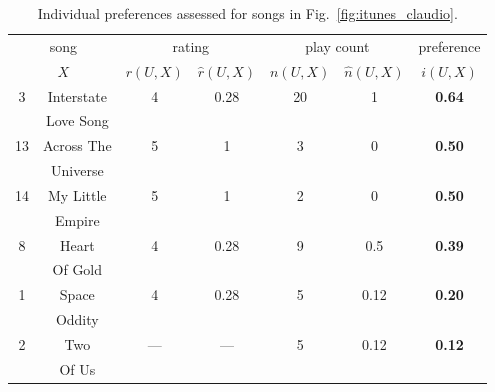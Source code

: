\begin{table}[bhtp]
\centering \setlength{\abovecaptionskip}{3pt}
\caption{Individual preferences assessed for songs in Fig.~\ref{fig:itunes_claudio}.}\label{table:itunes}
\begin{tabular}{|cc|c|c|c|c|c|}
\hline
\multicolumn{2}{|c|}{song}&\multicolumn{2}{c|}{rating}&\multicolumn{2}{c|}{play count}&preference\\
\multicolumn{2}{|c|}{$X$}&$r(U,X)$&$\widehat{r}(U,X)$&$n(U,X)$&$\widehat{n}(U,X)$&$i(U,X)$\\
\hline

\multirow{2}{*}{3}  & \small{Interstate} & \multirow{2}{*}{4} & 
\multirow{2}{*}{0.28} & \multirow{2}{*}{20} & \multirow{2}{*}{1} & \multirow{2}{*}{\textbf{0.64}}\\ & \small{Love Song} &&&&& \\ \hline

\multirow{2}{*}{13}  & \small{Across The} & \multirow{2}{*}{5} & 
\multirow{2}{*}{1} & \multirow{2}{*}{3} & \multirow{2}{*}{0} & 
\multirow{2}{*}{\textbf{0.50}}\\ & \small{Universe} &&&&& \\ \hline

\multirow{2}{*}{14}  & \small{My Little} & \multirow{2}{*}{5} & 
\multirow{2}{*}{1} & \multirow{2}{*}{2} & \multirow{2}{*}{0} &
\multirow{2}{*}{\textbf{0.50}}\\ & \small{Empire} &&&&& \\ \hline

\multirow{2}{*}{8}  & \small{Heart} & \multirow{2}{*}{4} & 
\multirow{2}{*}{0.28} & \multirow{2}{*}{9} & \multirow{2}{*}{0.5} & 
\multirow{2}{*}{\textbf{0.39}}\\ & \small{Of Gold} &&&&& \\ \hline

\multirow{2}{*}{1}  & \small{Space} & \multirow{2}{*}{4} & \multirow{2}{*}{0.28} & \multirow{2}{*}{5} & \multirow{2}{*}{0.12} & \multirow{2}{*}{\textbf{0.20}}\\ & \small{Oddity} &&&&& \\ \hline

\multirow{2}{*}{2}  & \small{Two} & \multirow{2}{*}{---} & 
\multirow{2}{*}{---} & \multirow{2}{*}{5} & \multirow{2}{*}{0.12} & \multirow{2}{*}{\textbf{0.12}}\\ & \small{Of Us} &&&&& \\ \hline


\end{tabular}
\end{table}



